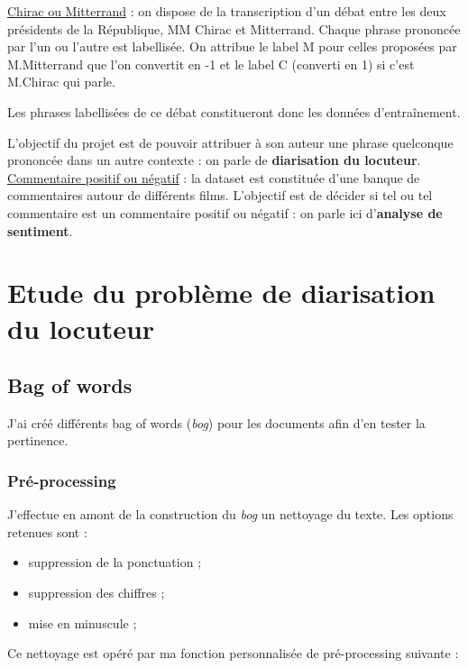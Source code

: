 \documentclass[a4paper,12pt]{article}
\begin{document}
\underline{Chirac ou Mitterrand} : on dispose de la transcription d'un débat entre les deux présidents de la République, MM Chirac et Mitterrand. Chaque phrase prononcée par l'un ou l'autre est labellisée. On attribue le label M pour celles proposées par M.Mitterrand que l'on convertit en -1 et le label C (converti en 1) si c'est M.Chirac qui parle. 

Les phrases labellisées de ce débat constitueront donc les données d'entraînement.

L'objectif du projet est de pouvoir attribuer à son auteur une phrase quelconque prononcée dans un autre contexte : on parle de \textbf{diarisation du locuteur}.\\

\underline{Commentaire positif ou négatif} : la dataset est constituée d'une banque de commentaires autour de différents films. L'objectif est de décider si tel ou tel commentaire est un commentaire positif ou négatif : on parle ici d'\textbf{analyse de sentiment}. 

\section{Etude du problème de diarisation du locuteur}

\subsection{Bag of words}

J'ai créé différents bag of words (\textit{bog}) pour les documents afin d'en tester la pertinence.
\subsubsection{Pré-processing}

J'effectue en amont de la construction du \textit{bog} un nettoyage du texte. Les options retenues sont :
\begin{itemize}
\item suppression de la ponctuation ;
\item suppression des chiffres ;
\item mise en minuscule ;

\end{itemize} 

Ce nettoyage est opéré par ma fonction personnalisée de pré-processing suivante :
\end{document}
